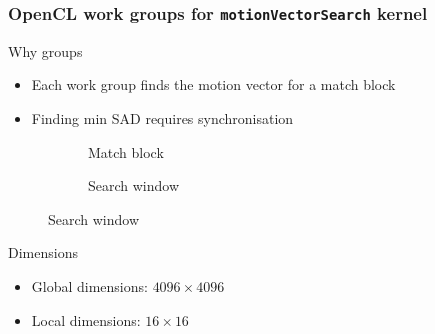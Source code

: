 \begin{frame}
  \frametitle{OpenCL work groups for \lstinline{motionVectorSearch}
    kernel}
  \begin{block}{Why groups}
    \begin{itemize}
    \item<+-> Each work group finds the \alert{motion vector} for a
      \alert{match block}
    \item<+-> Finding min \alert{SAD} requires synchronisation
    \end{itemize}
  \end{block}
  \begin{figure}
    \centering
    \begin{subfigure}{.5\textwidth}
      \centering
      \caption{Match block}
    \end{subfigure}%
    \begin{subfigure}{.5\textwidth}
      \centering
      \caption{Search window}
    \end{subfigure}
  \end{figure}
  \onslide<+->
  \begin{alertblock}{Dimensions}
    \begin{itemize}
    \item<+-> Global dimensions: \(4096 \times 4096\)
    \item<+-> Local dimensions: \(16 \times 16\)
    \end{itemize}
  \end{alertblock}
\end{frame}

